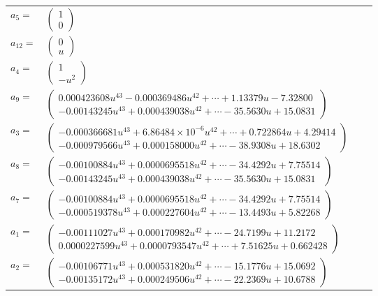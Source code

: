 \documentclass[1p]{elsarticle_modified}
\theoremstyle{definition}
\begin{document}
\begin{tabular}{m{7pt} m{180pt} m{7pt} m{180pt} }
\flushright $a_{5}=$&$\begin{pmatrix}1\\0\end{pmatrix}$ \\
\flushright $a_{12}=$&$\begin{pmatrix}0\\u\end{pmatrix}$ \\
\flushright $a_{4}=$&$\begin{pmatrix}1\\- u^2\end{pmatrix}$ \\
\flushright $a_{9}=$&$\begin{pmatrix}0.000423608 u^{43}-0.000369486 u^{42}+\cdots+1.13379 u-7.32800\\-0.00143245 u^{43}+0.000439038 u^{42}+\cdots-35.5630 u+15.0831\end{pmatrix}$ \\
\flushright $a_{3}=$&$\begin{pmatrix}-0.000366681 u^{43}+6.86484\times10^{-6} u^{42}+\cdots+0.722864 u+4.29414\\-0.000979566 u^{43}+0.000158000 u^{42}+\cdots-38.9308 u+18.6302\end{pmatrix}$ \\
\flushright $a_{8}=$&$\begin{pmatrix}-0.00100884 u^{43}+0.0000695518 u^{42}+\cdots-34.4292 u+7.75514\\-0.00143245 u^{43}+0.000439038 u^{42}+\cdots-35.5630 u+15.0831\end{pmatrix}$ \\
\flushright $a_{7}=$&$\begin{pmatrix}-0.00100884 u^{43}+0.0000695518 u^{42}+\cdots-34.4292 u+7.75514\\-0.000519378 u^{43}+0.000227604 u^{42}+\cdots-13.4493 u+5.82268\end{pmatrix}$ \\
\flushright $a_{1}=$&$\begin{pmatrix}-0.00111027 u^{43}+0.000170982 u^{42}+\cdots-24.7199 u+11.2172\\0.0000227599 u^{43}+0.0000793547 u^{42}+\cdots+7.51625 u+0.662428\end{pmatrix}$ \\
\flushright $a_{2}=$&$\begin{pmatrix}-0.00106771 u^{43}+0.000531820 u^{42}+\cdots-15.1776 u+15.0692\\-0.00135172 u^{43}+0.000249506 u^{42}+\cdots-22.2369 u+10.6788\end{pmatrix}$ \\

\end{tabular}
\end{document}
